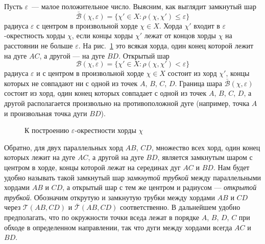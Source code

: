 \documentclass[12pt]{article}
\begin{document}
Пусть $\varepsilon$~--- малое положительное число. Выясним, как выглядит
замкнутый шар
$$
\bar{\mathcal B}(\chi, \varepsilon)=\{\chi'\in X\colon \rho(\chi,
\chi')\leqslant \varepsilon\}
$$ радиуса $\varepsilon$ с
центром в произвольной хорде $\chi\in X$. Хорда $\chi'$ входит в
$\varepsilon$-окрестность хорды $\chi$, если концы хорды $\chi'$ лежат от концов
хорды $\chi$ на расстоянии не больше $\varepsilon$. На рис.~\ref{AZ:fig:ball}
это всякая хорда, один конец которой лежит на дуге $AC$, а другой --- на дуге
$BD$. Открытый шар
$$
{\mathcal B}(\chi, \varepsilon)=\{\chi'\in X\colon \rho(\chi,
\chi')< \varepsilon\}
$$ радиуса $\varepsilon$ и с
центром в произвольной хорде $\chi\in X$ состоит из хорд $\chi'$, концы которых
не совпадают ни с одной из точек $A$, $B$, $C$, $D$. Граница шара $\bar{\mathcal
  B}(\chi, \varepsilon)$  состоит из  хорд, один конец которых совпадает с одной
из точек $A$, $B$, $C$, $D$, а другой располагается произвольно на
противоположной дуге (например, точка $A$ и произвольная точка дуги $BD$).

\begin{figure}[h]
  \centering
\caption{\label{AZ:fig:ball}%
К построению $\varepsilon$-окрестности хорды $\chi$}
\end{figure}


Обратно, для двух параллельных хорд $AB$, $CD$, множество всех хорд, один конец
которых лежит на дуге $AC$, а другой на дуге $BD$, является замкнутым шаром с
центром в хорде, концы которой лежат на серединах дуг $AC$ и $BD$.  Нам будет
удобно  называть такой замкнутый шар \emph{замкнутой трубкой} между
параллельными хордами $AB$ и $CD$, а открытый шар с тем же центром и радиусом
--- \emph{открытой трубкой}. Обозначим открутую и замкнутую трубки между хордами
$AB$ и $CD$ через $\mathcal T(AB, CD)$ и $\bar{\mathcal T}(AB, CD)$
соответственно. В дальнейшем удобно предполагать, что по окружности точки вседа
лежат в порядке $A$, $B$, $D$, $C$ при обходе в определенном направлении, так
что дуги между хордами всегда $AC$ и $BD$.
\end{document}
